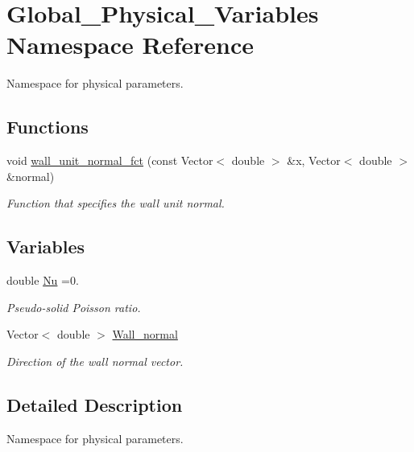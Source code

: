 \hypertarget{namespaceGlobal__Physical__Variables}{}\section{Global\+\_\+\+Physical\+\_\+\+Variables Namespace Reference}
\label{namespaceGlobal__Physical__Variables}


Namespace for physical parameters.  


\subsection*{Functions}
\begin{DoxyCompactItemize}
\item 
void \hyperlink{namespaceGlobal__Physical__Variables_a0d48e8726fa485de2b2df2d5031ec41b}{wall\+\_\+unit\+\_\+normal\+\_\+fct} (const Vector$<$ double $>$ \&x, Vector$<$ double $>$ \&normal)
\begin{DoxyCompactList}\small\item\em Function that specifies the wall unit normal. \end{DoxyCompactList}\end{DoxyCompactItemize}
\subsection*{Variables}
\begin{DoxyCompactItemize}
\item 
double \hyperlink{namespaceGlobal__Physical__Variables_a3962c36313826b19f216f6bbbdd6a477}{Nu} =0.
\begin{DoxyCompactList}\small\item\em Pseudo-\/solid Poisson ratio. \end{DoxyCompactList}\item 
Vector$<$ double $>$ \hyperlink{namespaceGlobal__Physical__Variables_a5feb3df21fc4a0adefadecb8a8ed98d7}{Wall\+\_\+normal}
\begin{DoxyCompactList}\small\item\em Direction of the wall normal vector. \end{DoxyCompactList}\end{DoxyCompactItemize}


\subsection{Detailed Description}
Namespace for physical parameters. 

